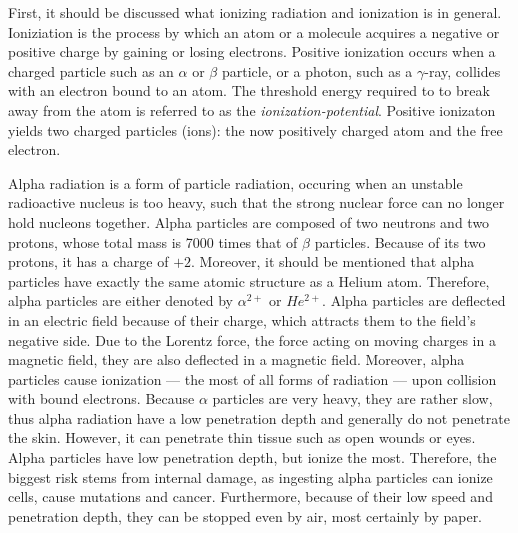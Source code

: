 



\thispagestyle{plain}




First, it should be discussed what ionizing radiation and ionization is in general. Ioniziation is the process by which an atom or a molecule acquires a negative or positive charge by gaining or losing electrons. Positive ionization occurs when a charged particle such as an $\alpha$ or $\beta$ particle, or a photon, such as a $\gamma$-ray, collides with an electron bound to an atom. The threshold energy required to to break away from the atom is referred to as the \emph{ionization-potential}. Positive ionizaton yields two charged particles (ions): the now positively charged atom and the free electron.


Alpha radiation is a form of particle radiation, occuring when an unstable radioactive nucleus is too heavy, such that the strong nuclear force can no longer hold nucleons together. Alpha particles are composed of two neutrons and two protons, whose total mass is 7000 times that of $\beta$ particles. Because of its two protons, it has a charge of $+2$. Moreover, it should be mentioned that alpha particles have exactly the same atomic structure as a Helium atom. Therefore, alpha particles are either denoted by $\alpha^{2+}$ or $He^{2+}$. Alpha particles are deflected in an electric field because of their charge, which attracts them to the field's negative side. Due to the Lorentz force, the force acting on moving charges in a magnetic field, they are also deflected in a magnetic field. Moreover, alpha particles cause ionization --- the most of all forms of radiation --- upon collision with bound electrons. Because $\alpha$ particles are very heavy, they are rather slow, thus alpha radiation have a low penetration depth and generally do not penetrate the skin. However, it can penetrate thin tissue such as open wounds or eyes. Alpha particles have low penetration depth, but ionize the most. Therefore, the biggest risk stems from internal damage, as ingesting alpha particles can ionize cells, cause mutations and cancer. Furthermore, because of their low speed and penetration depth, they can be stopped even by air, most certainly by paper.

